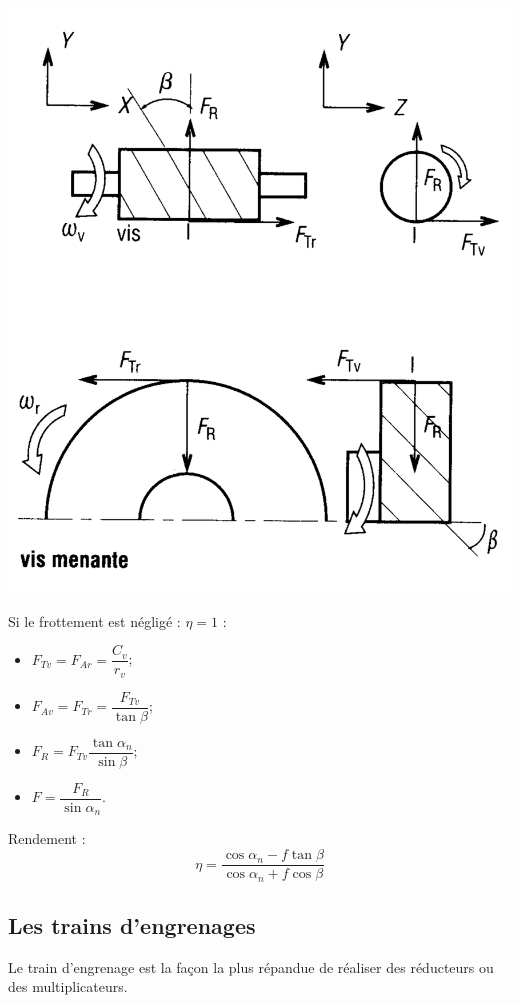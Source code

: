 \documentclass[11pt,oneside]{article}
\begin{document}
\begin{minipage}[c]{.45\linewidth}
\begin{center}
\includegraphics[width=.9\textwidth]{png/fig_79}
\end{center}
\end{minipage} \hfill
\begin{minipage}[c]{.45\linewidth}
Si le frottement est négligé : $\eta=1$ :
\begin{itemize}
\item $F_{Tv}=F_{Ar} = \dfrac{C_v}{r_v}$;
\item $F_{Av}=F_{Tr} = \dfrac{F_{Tv}}{\tan \beta}$;
\item $F_R = F_{Tv} \dfrac{\tan \alpha_n }{\sin \beta}$;
\item $F = \dfrac{F_R}{\sin \alpha_n}$.
\end{itemize}

Rendement :
$$
\eta = \dfrac{\cos \alpha_n - f\tan \beta}{\cos \alpha_n + f\cos \beta}
$$

\end{minipage} 

\subsection{Les trains d'engrenages}
Le train d’engrenage est la façon la plus répandue de réaliser des réducteurs ou des multiplicateurs.
\end{document}
